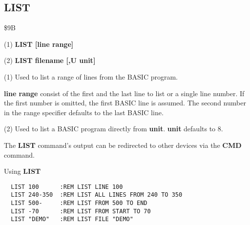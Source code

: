 \subsection{LIST}
\begin{description}[leftmargin=2cm,style=nextline]
\item [Token:] \$9B
\item [Format:] (1) {\bf LIST [line range]}

(2) {\bf LIST filename [,U unit]}

\item [Usage:] (1) Used to list a range of lines from the BASIC program.

               {\bf line range} consist of the first and the last
               line to list or a single line number.
               If the first number is omitted, the
               first BASIC line is assumed.
               The second number in the range specifier defaults
               to the last BASIC line.

               (2) Used to list a BASIC program directly from {\bf unit}.
               {\bf unit} defaults to 8.

\item [Remarks:] The {\bf LIST} command's output can be redirected
                 to other devices via the {\bf CMD} command.

\item [Example:] Using {\bf LIST}
\begin{tcolorbox}[colback=black,coltext=white]
\verbatimfont{\codefont}
\begin{verbatim}
  LIST 100      :REM LIST LINE 100
  LIST 240-350  :REM LIST ALL LINES FROM 240 TO 350
  LIST 500-     :REM LIST FROM 500 TO END
  LIST -70      :REM LIST FROM START TO 70
  LIST "DEMO"   :REM LIST FILE "DEMO"
\end{verbatim}
\end{tcolorbox}
\end{description}


\newpage
